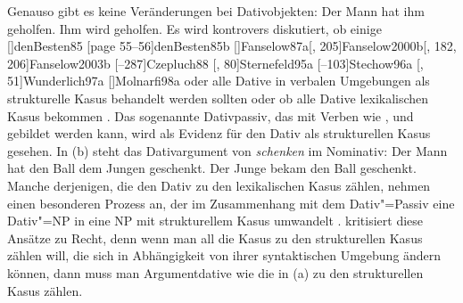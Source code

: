 Genauso gibt es keine Veränderungen bei Dativobjekten:
\eal
\ex Der Mann hat ihm geholfen.
\ex Ihm wird geholfen.
\zl
Es wird kontrovers diskutiert, ob einige 
\parencites
{Wegener85a}%
{Wegener90}%
[]{denBesten85}%
[page 55--56]{denBesten85b}%
[]{Fanselow87a}[, 205]{Fanselow2000b}[, 182, 206]{Fanselow2003b}%
[--287]{Czepluch88}%
[, 80]{Sternefeld95a}%
[--103]{Stechow96a}%
[, 51]{Wunderlich97a}%
[]{Molnarfi98a} %
oder alle \parencites[]{Sternefeld95a}%
[, 205--206]{Ryu97a}%
[--97]{Gunkel2003b} Dative in verbalen Umgebungen als
strukturelle Kasus behandelt werden sollten 
oder ob alle Dative lexikalischen Kasus bekommen \parencites[]{Haider85b}%
[]{Haider86}[, 217, 228]{HM94a}%
{Mueller99a,Mueller2001a}[]{Mueller2003e}%
[]{Scherpenisse86a}%
[, 291]{Pollard94a}%
[]{Meurers99b}[]{VS98a}[]{Abraham95a-u}%
[]{McIntyre2006a}%
{Woolford2006a}.
%
%
Das sogenannte Dativpassiv, das mit Verben wie
,  und  gebildet werden kann,
wird als Evidenz für den Dativ als strukturellen Kasus gesehen.
In (b) steht das Dativargument von \emph{schenken} im Nominativ:
\eal
\ex Der Mann  hat   den Ball dem Jungen geschenkt.
\ex Der Junge bekam den Ball            geschenkt.
\zl
Manche derjenigen, die den Dativ zu den lexikalischen Kasus zählen, nehmen
einen besonderen Prozess an, der im Zusammenhang mit dem Dativ"=Passiv
eine Dativ"=NP in eine NP mit strukturellem Kasus umwandelt 
\parencites[Abschnitt~4.1]{Haider86}[]{HM94a}[]{Mueller99a}.
\citet{Gunkel2003b} kritisiert diese Ansätze zu Recht, denn wenn man all die
Kasus zu den strukturellen Kasus zählen will, die sich in Abhängigkeit von
ihrer syntaktischen Umgebung ändern können, dann muss man Argumentdative wie die
in (a) zu den strukturellen Kasus zählen.

